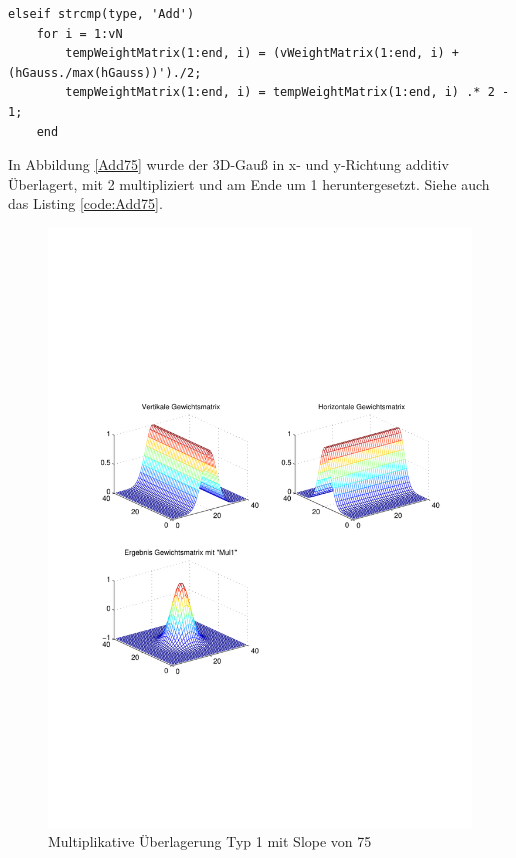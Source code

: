 \begin{lstlisting}[label=code:Add75, caption=Auszug Matlab-Skript 'GetGaussWeights()']
elseif strcmp(type, 'Add')
	for i = 1:vN
		tempWeightMatrix(1:end, i) = (vWeightMatrix(1:end, i) + (hGauss./max(hGauss))')./2;
		tempWeightMatrix(1:end, i) = tempWeightMatrix(1:end, i) .* 2 - 1;
	end
\end{lstlisting}

In Abbildung \ref{Add75} wurde der 3D-Gauß in x- und y-Richtung additiv Überlagert, mit 2 multipliziert und am Ende um 1 heruntergesetzt. Siehe auch das Listing \ref{code:Add75}.

\newpage
\begin{figure}[hbt]
	\centering
	\includegraphics[width=1\linewidth]{./Bilder/Auswertung/GewichtmatrixEinzelschritte/Endergebnis_Gewichtsmatrix_Slope_75_Type_Mul1}
	\caption{Multiplikative Überlagerung Typ 1 mit Slope von 75}
	\label{Mul175}
\end{figure}

